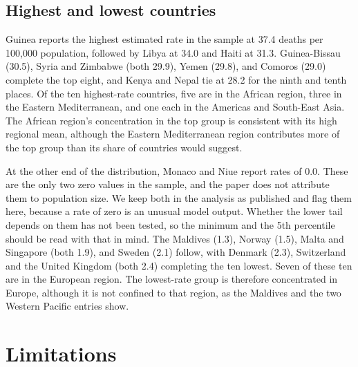 \documentclass[12pt]{article}
\begin{document}


\subsection{Highest and lowest countries}

Guinea reports the highest estimated rate in the sample at 37.4 deaths per 100,000 population, followed by Libya at 34.0 and Haiti at 31.3. Guinea-Bissau (30.5), Syria and Zimbabwe (both 29.9), Yemen (29.8), and Comoros (29.0) complete the top eight, and Kenya and Nepal tie at 28.2 for the ninth and tenth places.
Of the ten highest-rate countries, five are in the African region, three in the Eastern Mediterranean, and one each in the Americas and South-East Asia. The African region's concentration in the top group is consistent with its high regional mean, although the Eastern Mediterranean region contributes more of the top group than its share of countries would suggest.

At the other end of the distribution, Monaco and Niue report rates of 0.0. These are the only two zero values in the sample, and the paper does not attribute them to population size. We keep both in the analysis as published and flag them here, because a rate of zero is an unusual model output. Whether the lower tail depends on them has not been tested, so the minimum and the 5th percentile should be read with that in mind.
The Maldives (1.3), Norway (1.5), Malta and Singapore (both 1.9), and Sweden (2.1) follow, with Denmark (2.3), Switzerland and the United Kingdom (both 2.4) completing the ten lowest.
Seven of these ten are in the European region. The lowest-rate group is therefore concentrated in Europe, although it is not confined to that region, as the Maldives and the two Western Pacific entries show.

\section{Limitations}
\end{document}
